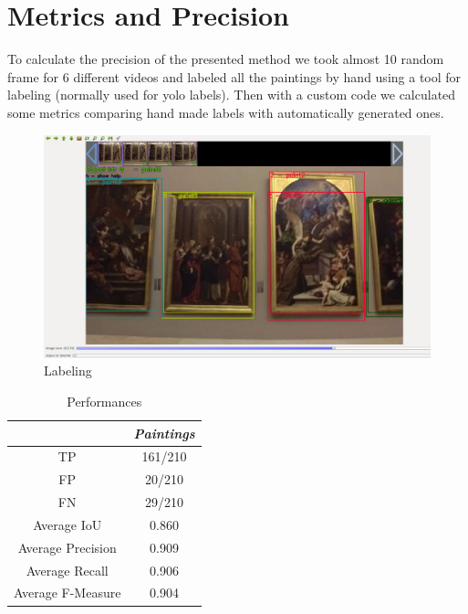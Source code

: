 \documentclass[conference]{IEEEtran}
\begin{document}
\section{Metrics and Precision}
To calculate the precision of the presented method we took almost 10 random frame for 6 different videos and labeled all the paintings by hand using a tool for labeling (normally used for yolo labels). Then with a custom code we calculated some metrics comparing hand made labels with automatically generated ones.

\begin{figure}[htbp]
\centerline{\includegraphics[width=0.8\columnwidth]{../Labeling_precision_metrics/Precision_Labeling.png}}
\caption{Labeling}
\label{fig_labeling}
\end{figure}

\begin{table}[htbp]
\caption{Performances}
\begin{center}
\begin{tabular}{|c|c|}
\hline
\textbf{} & \textbf{\textit{Paintings}} \\
\hline
TP& 161/210\\
\hline
FP& 20/210\\
\hline
FN& 29/210\\
\hline
Average IoU& 0.860\\
\hline
Average Precision& 0.909\\
\hline
Average Recall& 0.906\\
\hline
Average F-Measure& 0.904\\
\hline
\end{tabular}
\label{tab1}
\end{center}
\end{table}
\end{document}
